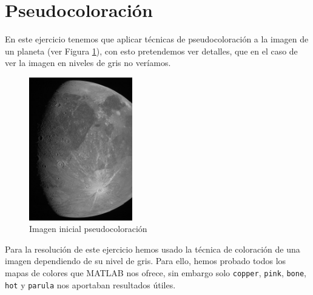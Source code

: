 \documentclass[12pt]{article}
\begin{document}
	\section{Pseudocoloración}
	
	\noindent En este ejercicio tenemos que aplicar técnicas de pseudocoloración a la imagen de un planeta (ver Figura \ref{img: pseudocoloracion src}), con esto pretendemos ver detalles, que en el caso de ver la imagen en niveles de gris no veríamos.
	
	\begin{figure}[h]
		\begin{center}
			\includegraphics[width=0.4\textwidth]{img/pseudocoloracion.jpg}
			\caption{Imagen inicial pseudocoloración}
			\label{img: pseudocoloracion src}
		\end{center}
	\end{figure}

	\noindent Para la resolución de este ejercicio hemos usado la técnica de coloración de una imagen dependiendo de su nivel de gris. Para ello, hemos probado todos los mapas de colores que MATLAB nos ofrece, sin embargo solo \texttt{copper}, \texttt{pink}, \texttt{bone}, \texttt{hot} y \texttt{parula} nos aportaban resultados útiles.
	
\end{document}
